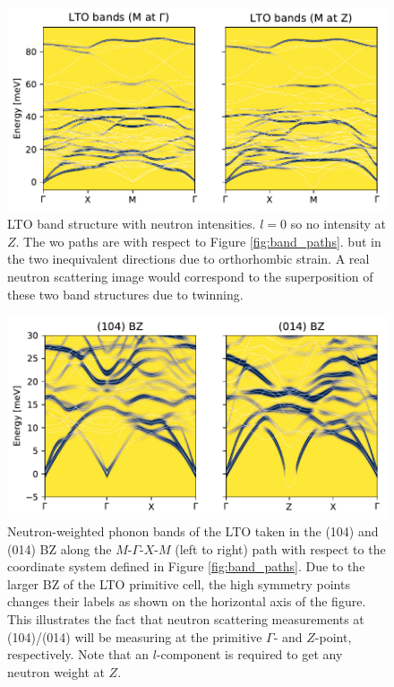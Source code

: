 \begin{figure}
	\centering
	\includegraphics[width=\textwidth]{fig/simulation/lto_neutron_bands.pdf}
	\caption[LTO band structure with neutron intensities]{LTO band structure with neutron intensities. $l=0$ so no intensity at $Z$. The wo paths are with respect to Figure \ref{fig:band_paths}. but in the two inequivalent directions due to orthorhombic strain. A real neutron scattering image would correspond to the superposition of these two band structures due to twinning.}
	\label{fig:lco_lto_netron_bands}
\end{figure}

\begin{figure}
	\centering
	\includegraphics[width=\textwidth]{fig/simulation/lco_soft_modes.pdf}
	\caption[LCO, LTO: soft mode simulation]{Neutron-weighted phonon bands of the LTO taken in the (104) and (014) BZ along the $M$-$\Gamma$-$X$-$M$ (left to right) path with respect to the coordinate system defined in Figure \ref{fig:band_paths}. Due to the larger BZ of the LTO primitive cell, the high symmetry points changes their labels as shown on the horizontal axis of the figure. This illustrates the fact that neutron scattering measurements at (104)/(014) will be measuring at the primitive $\Gamma$- and $Z$-point, respectively. Note that an $l$-component is required to get any neutron weight at $Z$.}
	\label{fig:lco_soft_sim}
\end{figure}

